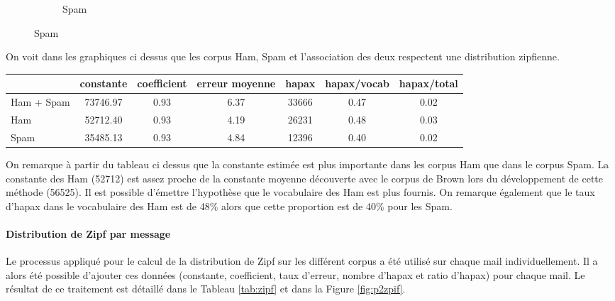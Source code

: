 \documentclass[a4paper,12pt]{article}
\begin{document}
\begin{figure}[H]
\begin{subfigure}[b]{0.3\linewidth}
  					\caption{Spam}
				\end{subfigure}  				
  				\label{fig:coffee}
			\end{figure}	
			
			On voit dans les graphiques ci dessus que les corpus Ham, Spam et l'association des deux respectent une distribution zipfienne.
			
			\begin{table}[H]
			\centering
				\begin{tabular}{|l|c|c|c||c|c|c|}
					\hline
								& constante & coefficient & erreur moyenne & hapax & hapax/vocab & hapax/total \\
					\hline
					Ham + Spam  & 73746.97  & 0.93        & 6.37	             & 33666 & 0.47              & 0.02 \\
					\hline
					Ham 		    & 52712.40  & 0.93        & 4.19              & 26231 & 0.48              & 0.03 \\
					\hline
					Spam		    & 35485.13  & 0.93        & 4.84              & 12396 & 0.40              & 0.02 \\
					\hline
				\end{tabular}
			\end{table}
			
			On remarque à partir du tableau ci dessus que la constante estimée est plus importante dans les corpus Ham que dans le corpus Spam. La constante des Ham (52712) est assez proche de la constante moyenne découverte avec le corpus de Brown lors du développement de cette méthode (56525). Il est possible d'émettre l'hypothèse que le vocabulaire des Ham est plus fournis. On remarque également que le taux d'hapax dans le vocabulaire des Ham est de 48\% alors que cette proportion est de 40\% pour les Spam.    
			
			
			\paragraph{Distribution de Zipf par message} Le processus appliqué pour le calcul de la distribution de Zipf sur les différent corpus a été utilisé sur chaque mail individuellement. Il a alors été possible d'ajouter ces données (constante, coefficient, taux d'erreur, nombre d'hapax et ratio d'hapax) pour chaque mail. Le résultat de ce traitement est détaillé dans le Tableau \ref{tab:zipf} et dans la Figure \ref{fig:p2zpif}.
			
\end{document}

